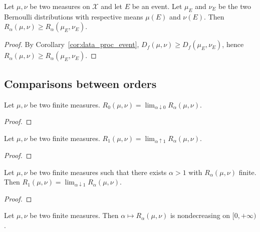 \begin{lemma}
  \label{lem:renyi_data_proc_event}
  Let $\mu, \nu$ be two measures on $\mathcal X$ and let $E$ be an event. Let $\mu_E$ and $\nu_E$ be the two Bernoulli distributions with respective means $\mu(E)$ and $\nu(E)$.
  Then $R_\alpha(\mu, \nu) \ge R_\alpha(\mu_E, \nu_E)$.
\end{lemma}

\begin{proof}
By Corollary~\ref{cor:data_proc_event}, $D_f(\mu, \nu) \ge D_f(\mu_E, \nu_E)$, hence $R_\alpha(\mu, \nu) \ge R_\alpha(\mu_E, \nu_E)$.
\end{proof}

\subsection{Comparisons between orders}

\begin{lemma}
  \label{lem:renyi_tendsto_renyi_zero}
  Let $\mu, \nu$ be two finite measures. $R_0(\mu, \nu) = \lim_{\alpha \downarrow 0} R_\alpha(\mu, \nu)$.
\end{lemma}

\begin{proof}
\end{proof}

\begin{lemma}
  \label{lem:renyi_tendsto_renyi_one}
  Let $\mu, \nu$ be two finite measures. $R_1(\mu, \nu) = \lim_{\alpha \uparrow 1} R_\alpha(\mu, \nu)$.
\end{lemma}

\begin{proof}
\end{proof}

\begin{lemma}
  \label{lem:renyi_tendsto_renyi_one_above}
  Let $\mu, \nu$ be two finite measures such that there exists $\alpha > 1$ with $R_\alpha(\mu, \nu)$ finite. Then $R_1(\mu, \nu) = \lim_{\alpha \downarrow 1} R_\alpha(\mu, \nu)$.
\end{lemma}

\begin{proof}
\end{proof}

\begin{lemma}
  \label{lem:renyi_monotone}
  Let $\mu, \nu$ be two finite measures. Then $\alpha \mapsto R_\alpha(\mu, \nu)$ is nondecreasing on $[0, + \infty)$.
\end{lemma}

